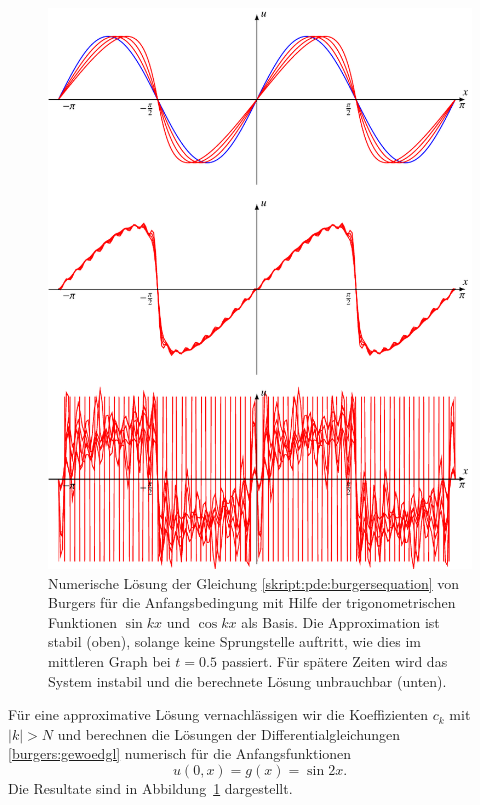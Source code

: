 \begin{figure}
\centering
\includegraphics{chapters/2/burgfourier.pdf}
\caption{Numerische Lösung der Gleichung
\eqref{skript:pde:burgersequation}
von Burgers für die Anfangsbedingung mit Hilfe der trigonometrischen
Funktionen $\sin kx$ und $\cos kx$ als Basis.
Die Approximation ist stabil (oben), solange keine Sprungstelle auftritt,
wie dies im mittleren Graph bei $t=0.5$ passiert.
Für spätere Zeiten wird das System instabil und die berechnete Lösung
unbrauchbar (unten).
\label{skript:burgfourier}}
\end{figure}%

Für eine approximative Lösung vernachlässigen wir die Koeffizienten $c_k$
mit $|k|>N$ und berechnen die Lösungen der Differentialgleichungen
\eqref{burgers:gewoedgl} numerisch für die Anfangsfunktionen
\begin{equation}
u(0,x) = g(x) = \sin 2x.
\end{equation}
Die Resultate sind in Abbildung~\ref{skript:burgfourier} dargestellt.

